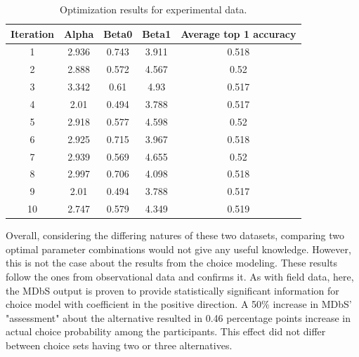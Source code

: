 \documentclass[a4paper,12pt]{article}
\begin{document}
\begin{table}
    \centering
    
    \begin{tabular}{ccccc}
    \hline
    Iteration & Alpha & Beta0 & Beta1 & Average top 1 accuracy \\
    \hline
    1 & 2.936 & 0.743 & 3.911 & 0.518 \\
    2 & 2.888 & 0.572 & 4.567 & 0.52 \\
    3 & 3.342 & 0.61 & 4.93 & 0.517 \\
    4 & 2.01 & 0.494 & 3.788 & 0.517 \\
    5 & 2.918 & 0.577 & 4.598 & 0.52 \\
    6 & 2.925 & 0.715 & 3.967 & 0.518 \\
    7 & 2.939 & 0.569 & 4.655 & 0.52 \\
    8 & 2.997 & 0.706 & 4.098 & 0.518 \\
    9 & 2.01 & 0.494 & 3.788 & 0.517 \\
    10 & 2.747 & 0.579 & 4.349 & 0.519 \\
    \hline
    \end{tabular}
    \caption{Optimization results for experimental data.}
    \label{tab:optimizationNoghuchiResults}
\end{table}

Overall, considering the differing natures of these two datasets, comparing two optimal parameter combinations would not give any useful knowledge. However, this is not the case about the results from the choice modeling. These results follow the ones from observational data and confirms it. As with field data, here, the MDbS output is proven to provide statistically significant information for choice model with coefficient in the positive direction. A 50\% increase in MDbS' "assessment" about the alternative resulted in 0.46 percentage points increase in actual choice probability among the participants. This effect did not differ between choice sets having two or three alternatives.
\end{document}
